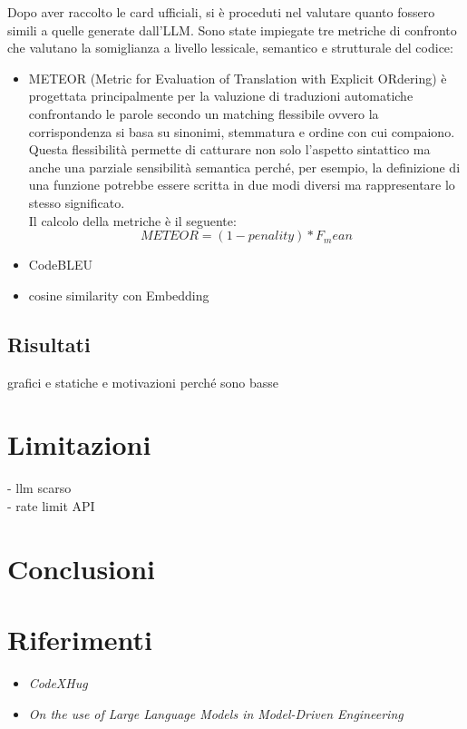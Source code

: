 \documentclass{article}
\begin{document}
Dopo aver raccolto le card ufficiali, si è proceduti nel valutare quanto fossero simili a quelle generate dall'LLM. Sono state impiegate tre metriche di confronto che valutano la somiglianza a livello lessicale, semantico e strutturale del codice:
\begin{itemize}
    \item METEOR (Metric for Evaluation of Translation with Explicit ORdering) è progettata principalmente per la valuzione di traduzioni automatiche confrontando le parole secondo un matching flessibile ovvero la corrispondenza si basa su sinonimi, stemmatura e ordine con cui compaiono. Questa flessibilità permette di catturare non solo l'aspetto sintattico ma anche una parziale sensibilità semantica perché, per esempio, la definizione di una funzione potrebbe essere scritta in due modi diversi ma rappresentare lo stesso significato.\\
    Il calcolo della metriche è il seguente:
    \[
    METEOR = (1-penality)*F_mean
    \]

    
    \item CodeBLEU
    \item cosine similarity con Embedding
\end{itemize}


\subsection{Risultati}
grafici e statiche e motivazioni perché sono basse


\section{Limitazioni}
- llm scarso\\
- rate limit API


\section{Conclusioni}

\section{Riferimenti}
\begin{itemize}
    \item \textit{CodeXHug}
    \item \textit{On the use of Large Language Models in Model-Driven Engineering}
\end{itemize}
\end{document}
